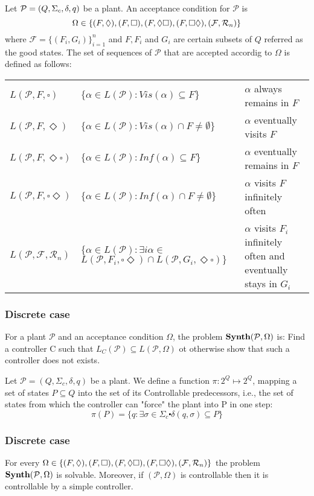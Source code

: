 \documentclass[table]{beamer}
\begin{document}
\begin{frame}
	\begin{dfn}
		Let $\mathcal{P}=(Q,\Sigma_c,\delta, q)$ be a plant. An acceptance condition for $\mathcal{P}$ is
		$$ \Omega \in \{(F,\Diamond),(F,\square ),(F,\Diamond\square),(F,\square\Diamond),(\mathcal{F},\mathcal{R}_n)\}$$
		where $\mathcal{F} = \{(F_i,G_i)\}^{n}_{i=1}$ and $F, F_i$ and $G_i$ 
		are certain subsets of $Q$ referred as the good states. The set of sequences of $\mathcal{P}$ that are accepted
		accordig to $\Omega$ is defined as follows:
	\end{dfn}
	\begin{adjustwidth}{-1cm}{-1cm}
	\begin{table}[]
		\begin{tabular}{lll}
		\hline
		\rowcolor{azzurro_chiaro}
		$L(\mathcal{P},F,\square)$ & $\{\alpha \in L(\mathcal{P}):Vis(\alpha)\subseteq F\}$ & $\alpha$ always remains in $F$ \\ 
		$L(\mathcal{P},F,\Diamond)$ & $\{\alpha \in L(\mathcal{P}):Vis(\alpha)\cap F \neq \emptyset\}$ & $\alpha$ eventually visits $F$ \\ 
		\rowcolor{azzurro_chiaro}
		$L(\mathcal{P},F,\Diamond\square)$ & $\{\alpha \in L(\mathcal{P}):Inf(\alpha)\subseteq F\}$ & $\alpha$ eventually remains in $F$ \\ 
		$L(\mathcal{P},F,\square\Diamond)$ & $\{\alpha \in L(\mathcal{P}):Inf(\alpha)\cap F \neq \emptyset\}$ & $\alpha$ visits $F$ infinitely often \\ 
		\rowcolor{azzurro_chiaro}
		$L(\mathcal{P},\mathcal{F},\mathcal{R}_n)$ & \shortstack{
			$\{\alpha \in L(\mathcal{P}): \exists i \alpha \in$ \\
			$L(\mathcal{P},F_i,\square\Diamond) \cap L(\mathcal{P},G_i,\Diamond\square)\}$
		} & 
		\shortstack{
			$\alpha$ visits $F_i$ infinitely often \\
			 and eventually stays in $G_i$ }\\ \hline
		\end{tabular}
	\end{table}
	\end{adjustwidth}
\end{frame}

\begin{frame}
	\frametitle{Discrete case}
	\begin{dfn}
		For a plant $\mathcal{P}$ and an acceptance condition $\Omega$, the problem $\textbf{Synth}(\mathcal{P},\Omega)$ is:
		Find a controller C such that $L_C(\mathcal{P})\subseteq L(\mathcal{P},\Omega)$ ot otherwise show that such
		 a controller does not exists.
	\end{dfn}

	\begin{dfn}
		Let $\mathcal{P}=(Q,\Sigma_c,\delta, q)$ be a plant. We define a function 
		$\pi:2^Q \longmapsto 2^Q$, mapping a set of states $P \subseteq Q$ into the set of its Controllable 
		predecessors, i.e., the set of states from which the controller can "force" the plant into P in one step:
		$$ \pi(P) = \{q : \exists \sigma \in \Sigma_c \centerdot  \delta(q,\sigma) \subseteq P\} $$
	\end{dfn}
\end{frame}

\begin{frame}
	\frametitle{Discrete case}
	\begin{thm}
		For every $\Omega \in \{(F,\Diamond),(F,\square ),(F,\Diamond\square),(F,\square\Diamond),(\mathcal{F},\mathcal{R}_n)\}$
		the problem $\textbf{Synth}(\mathcal{P},\Omega)$ is solvable. Moreover, if $(\mathcal{P},\Omega)$ is controllable then 
		it is controllable by a simple controller.
	\end{thm}
\end{frame}
\end{document}
